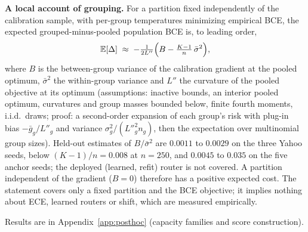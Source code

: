 \documentclass[sigconf,anonymous,review]{acmart}
\begin{document}
\textbf{A local account of grouping.} For a partition fixed independently
of the calibration sample, with per-group temperatures minimizing
empirical BCE, the expected grouped-minus-pooled population BCE is, to
leading order,
\begin{equation}
\mathbb E[\Delta]\;\approx\;-\tfrac1{2L''}\Bigl(B-\tfrac{K-1}{n}\,
\bar\sigma^2\Bigr),
\label{eq:gain}
\end{equation}
where $B$ is the between-group variance of the calibration gradient at
the pooled optimum, $\bar\sigma^2$ the within-group variance and $L''$
the curvature of the pooled objective at its optimum
(assumptions: inactive bounds, an interior pooled optimum,
curvatures and group masses bounded below, finite fourth moments, i.i.d.\
draws; proof: a second-order expansion of each group's risk with plug-in
bias $-\bar g_g/L''_g$ and variance $\sigma_g^2/(L''^2_gn_g)$, then the
expectation over multinomial group sizes). Held-out estimates of
$B/\bar\sigma^2$ are $0.0011$ to $0.0029$ on the three Yahoo seeds, below
$(K{-}1)/n=0.008$ at $n{=}250$, and $0.0045$ to $0.035$ on the five anchor
seeds; the deployed (learned, refit) router is not covered. A partition
independent of the gradient ($B{=}0$) therefore has a positive expected
cost. The statement covers only a fixed partition and the BCE objective;
it implies nothing about ECE, learned routers or shift, which are measured
empirically.

Results are in Appendix~\ref{app:posthoc} (capacity families and score construction).
\end{document}
